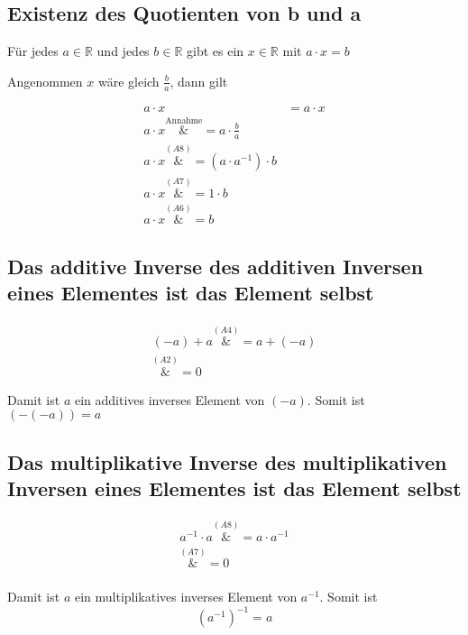 \documentclass{article}
\begin{document}
\subsection{Existenz des Quotienten von b und a}
Für jedes $a \in \mathbb{R}$ und jedes $b \in \mathbb{R}$ gibt es ein $x \in \mathbb{R}$
mit $a \cdot x = b$

Angenommen $x$ wäre gleich $\frac{b}{a}$, dann gilt

\begin{align*}
  a \cdot x &= a \cdot x \\
  a \cdot x \overset{\text{Annahme}}&= a \cdot \frac{b}{a} \\ 
  a \cdot x \overset{\hyperref[a8]{(A8)}}&= (a \cdot a^{-1}) \cdot b \\ 
  a \cdot x \overset{\hyperref[a7]{(A7)}}&= 1 \cdot b \\
  a \cdot x \overset{\hyperref[a6]{(A6)}}&= b
\end{align*}

\subsection{Das additive Inverse des additiven Inversen eines Elementes ist das Element selbst}

\begin{align*}
  (-a) + a \overset{\hyperref[a4]{(A4)}}&= a + (-a) \\
  \overset{\hyperref[a2]{(A2)}}&= 0
\end{align*}

Damit ist $a$ ein additives inverses Element von $(-a)$.
Somit ist $(-(-a)) = a$

\subsection{Das multiplikative Inverse des multiplikativen Inversen eines Elementes ist das Element selbst}

\begin{align*}
  a^{-1} \cdot a \overset{\hyperref[a8]{(A8)}}&= a \cdot a^{-1} \\
  \overset{\hyperref[a7]{(A7)}}&= 0 \\
\end{align*}

Damit ist $a$ ein multiplikatives inverses Element von $a^{-1}$.
Somit ist
\[
  (a^{-1})^{-1} = a
\]
\end{document}
